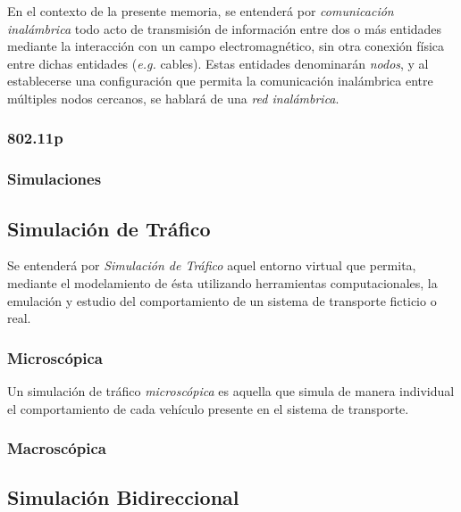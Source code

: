 En el contexto de la presente memoria, se entenderá por \emph{comunicación inalámbrica} todo acto de transmisión de información entre dos o más entidades mediante la interacción con un campo electromagnético, sin otra conexión física entre dichas entidades (\emph{e.g.} cables). Estas entidades denominarán \emph{nodos}, y al establecerse una configuración que permita la comunicación inalámbrica entre múltiples nodos cercanos, se hablará de una \emph{red inalámbrica}.

\subsubsection{802.11p}

\subsubsection{Simulaciones}

\subsection{Simulación de Tráfico}

Se entenderá por \emph{Simulación de Tráfico} aquel entorno virtual que permita, mediante el modelamiento de ésta utilizando herramientas computacionales, la emulación y estudio del comportamiento de un sistema de transporte ficticio o real.

\subsubsection{Microscópica}

Un simulación de tráfico \emph{microscópica} es aquella que simula de manera individual el comportamiento de cada vehículo presente en el sistema de transporte. 

\subsubsection{Macroscópica}
\subsection{Simulación Bidireccional}

